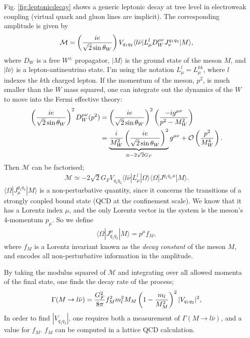 Fig. \ref{fig:leptonicdecay} shows a generic leptonic decay at tree level in electroweak coupling (virtual quark and gluon lines are implicit). The corresponding amplitude is given by
\begin{align}
  \mathcal{M} = \left({ie\over \sqrt{2}\sin\theta_W}\right) V_{q_1q_2} \langle l\bar{\nu} | L^l_{\mu} D_W^{\mu\nu} J_{\nu}^{q_1q_2} | M \rangle,
\end{align}
where $D_{W}$ is a free $W^{\pm}$ propagator, $|M\rangle$ is the ground state of the meson $M$, and $|l\bar{\nu}\rangle$ is a lepton-antineutrino state. I'm using the notation $L^l_{\mu}=L^{kk}_{\mu}$, where $l$ indexes the $k$th charged lepton. If the momentum of the meson, $p^2$, is much smaller than the $W$ mass squared, one can integrate out the dynamics of the $W$ to move into the Fermi effective theory:
\begin{align}
  \nonumber
  \left({ie\over\sqrt{2}\sin\theta_W}\right)^2 D^{\mu\nu}_W(p^2) &= \left({ie\over\sqrt{2}\sin\theta_W}\right)^2 \left( -ig^{\mu\nu} \over p^2 - M_W^2 \right)
  \\ & = \underbrace{ {i\over M_W^2} \left( ie \over \sqrt{2}\sin\theta_W \right)^2  }_{\equiv -2\sqrt{2}G_F} g^{\mu\nu} + \mathcal{O}\left({p^2\over M_W^4}\right).
\end{align}
Then $\mathcal{M}$ can be factorised;
\begin{align}
  \mathcal{M} \simeq -2\sqrt{2} G_F V_{q_1q_2} \langle l\bar{\nu} | L_{\mu}^l | \Omega \rangle \langle \Omega | J^{q_1q_2\, \mu} | M \rangle.
\end{align}
$\langle \Omega | J^{q_1q_2}_{\mu}| M \rangle$ is a non-perturbative quantity, since it concerns the transitions of a strongly coupled bound state (QCD at the confinement scale). We know that it has a Lorentz index $\mu$, and the only Lorentz vector in the system is the meson's 4-momentum $p_{\mu}$. So we define
\begin{align}
  \langle\Omega | J_{q_1q_2}^{\mu} | M \rangle = p^{\mu} f_M,
  \label{eq:decay_constant_def}
\end{align}
where $f_M$ is a Lorentz invariant known as the {\it{decay constant}} of the meson $M$, and encodes all non-perturbative information in the amplitude.

By taking the modulus squared of $\mathcal{M}$ and integrating over all allowed momenta of the final state, one finds the decay rate of the process;
\begin{align}
  \Gamma(M\to l\bar{\nu}) = {G_F^2\over 8\pi} f_M^2 m_l^2 M_M \left( 1 - {m_l\over M_M^2} \right)^2 |V_{q_1q_2}|^2,
\end{align}
In order to find $|V_{q_1q_2}|$, one requires both a measurement of $\Gamma(M\to l\bar{\nu})$, and a value for $f_M$. $f_M$ can be computed in a lattice QCD calculation.

